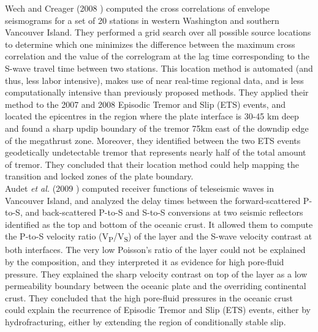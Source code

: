 \documentclass[main.tex]{subfiles}
\begin{document}
Wech and Creager (2008 \cite{WEC_2008}) computed the cross correlations of envelope seismograms for a set of 20 stations in western Washington and southern Vancouver Island. They performed a grid search over all possible source locations to determine which one minimizes the difference between the maximum cross correlation and the value of the correlogram at the lag time corresponding to the S-wave travel time between two stations. This location method is automated (and thus, less labor intensive), makes use of near real-time regional data, and is less computationally intensive than previously proposed methods. They applied their method to the 2007 and 2008 Episodic Tremor and Slip (ETS) events, and located the epicentres in the region where the plate interface is 30-45 km deep and found a sharp updip boundary of the tremor 75km east of the downdip edge of the megathrust zone. Moreover, they identified between the two ETS events geodetically undetectable tremor that represents nearly half of the total amount of tremor. They concluded that their location method could help mapping the transition and locked zones of the plate boundary. \\

Audet \textit{et al.} (2009 \cite{AUD_2009}) computed receiver functions of teleseismic waves in Vancouver Island, and analyzed the delay times between the forward-scattered P-to-S, and back-scattered P-to-S and S-to-S conversions at two seismic reflectors identified as the top and bottom of the oceanic crust. It allowed them to compute the P-to-S velocity ratio (V\textsubscript{P}/V\textsubscript{S}) of the layer and the S-wave velocity contrast at both interfaces. The very low Poisson's ratio of the layer could not be explained by the composition, and they interpreted it as evidence for high pore-fluid pressure. They explained the sharp velocity contrast on top of the layer as a low permeability boundary between the oceanic plate and the overriding continental crust. They concluded that the high pore-fluid pressures in the oceanic crust could explain the recurrence of Episodic Tremor and Slip (ETS) events, either by hydrofracturing, either by extending the region of conditionally stable slip.\\
\end{document}
